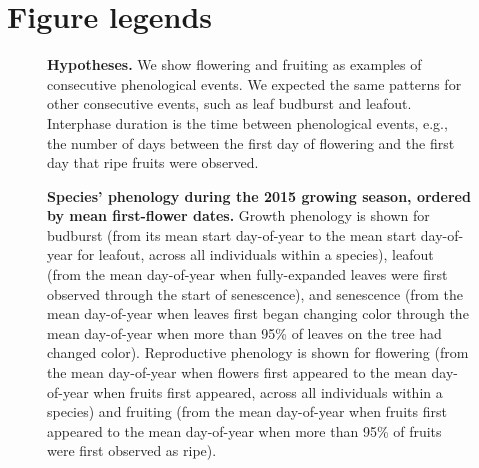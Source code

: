 \documentclass{article}
\begin{document}
\clearpage

\section* {Figure legends}
\begin{figure}[ht]
 \centering
 
 \caption{\textbf{Hypotheses.} We show flowering and fruiting as examples of consecutive phenological events. We expected the same patterns for other consecutive events, such as leaf budburst and leafout. Interphase duration is the time between phenological events, e.g., the number of days between the first day of flowering and the first day that ripe fruits were observed.} 
 \label{fig:hyp}
\end{figure}
 
\begin{figure}[ht]
 \centering
 \caption{\textbf{Species' phenology during the 2015 growing season, ordered by mean first-flower dates.} Growth phenology is shown for budburst (from its mean start day-of-year to the mean start day-of-year for leafout, across all individuals within a species), leafout (from the mean day-of-year when fully-expanded leaves were first observed through the start of senescence), and senescence (from the mean day-of-year when leaves first began changing color through the mean day-of-year when more than 95\% of leaves on the tree had changed color). Reproductive phenology is shown for flowering (from the mean day-of-year when flowers first appeared to the mean day-of-year when fruits first appeared, across all individuals within a species) and fruiting (from the mean day-of-year when fruits first appeared to the mean day-of-year when more than 95\% of fruits were first observed as ripe).}
 \label{fig:focsp}
\end{figure}
 
\end{document}
